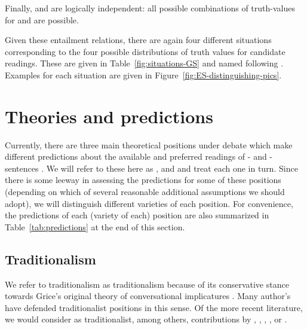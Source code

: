 \documentclass[fleqn,reqno,10pt,draft]{article}
\newcommand{\lit}{\acro{lit}}
\newcommand{\loc}{\acro{loc}}
\newcommand{\as}{\acro{as}}
\renewcommand{\es}{\acro{es}}
\begin{document}
\noindent Finally, \loc and \lit are logically independent: all
possible combinations of truth-values for \loc and \lit are possible.

Given these entailment relations, there are again four different
situations corresponding to the four possible distributions of truth
values for candidate readings. These are given in
Table~\ref{fig:situations-GS} and named following
\citet{ChemlaSpector2010:Experimental-Ev}. Examples for each situation
are given in Figure~\ref{fig:ES-distinguishing-pics}.





\section{Theories and predictions}
\label{sec:theories-predictions}

Currently, there are three main theoretical positions under debate
which make different predictions about the available and preferred
readings of \as- and \es-sentences \citep[c.f.][for
overview]{Horn2006:The-Border-Wars,Geurts2010:Quantity-Implic,Sauerland2012:The-Computation}. We
will refer to these here as ,
 and  and treat each
one in turn. Since there is some leeway in assessing the predictions
for some of these positions (depending on which of several reasonable
additional assumptions we should adopt), we will distinguish different
varieties of each position. For convenience, the predictions of each
(variety of each) position are also summarized in
Table~\ref{tab:predictions} at the end of this section.

\subsection{Traditionalism}
\label{sec:traditionalism}

We refer to traditionalism as traditionalism because of its
conservative stance towards Grice's original theory of conversational
implicatures \citep{Grice1975:Logic-and-Conve}. Many author's have
defended traditionalist positions in this sense. Of the more recent
literature, we would consider as traditionalist, among others,
contributions by \citet{Spector2006:Scalar-Implicat},
\citet{Sauerland2004:Scalar-Implicat},
\citet{Russell2006:Against-Grammat},
\citet{vanRooijSchulz:ExhaustiveInterpretation},
\citet{Geurts2010:Quantity-Implic} or
\citet{Franke2011:Quantity-Implic}.
\end{document}
